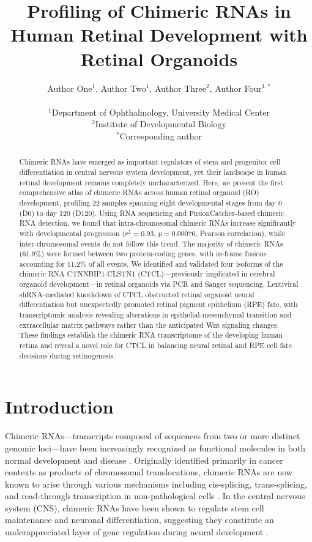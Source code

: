 \documentclass[12pt]{article}
\title{Profiling of Chimeric RNAs in Human Retinal Development with Retinal Organoids}
\author{Author One$^{1}$, Author Two$^{1}$, Author Three$^{2}$, Author Four$^{1,*}$\\
\\
\small $^{1}$Department of Ophthalmology, University Medical Center\\
\small $^{2}$Institute of Developmental Biology\\
\small $^{*}$Corresponding author}
\date{}
\begin{document}
\maketitle

\begin{abstract}
Chimeric RNAs have emerged as important regulators of stem and progenitor cell differentiation in central nervous system development, yet their landscape in human retinal development remains completely uncharacterized. Here, we present the first comprehensive atlas of chimeric RNAs across human retinal organoid (RO) development, profiling 22 samples spanning eight developmental stages from day 0 (D0) to day 120 (D120). Using RNA sequencing and FusionCatcher-based chimeric RNA detection, we found that intra-chromosomal chimeric RNAs increase significantly with developmental progression ($r^2 = 0.93$, $p = 0.00076$, Pearson correlation), while inter-chromosomal events do not follow this trend. The majority of chimeric RNAs (61.9\%) were formed between two protein-coding genes, with in-frame fusions accounting for 11.2\% of all events. We identified and validated four isoforms of the chimeric RNA CTNNBIP1-CLSTN1 (CTCL)---previously implicated in cerebral organoid development---in retinal organoids via PCR and Sanger sequencing. Lentiviral shRNA-mediated knockdown of CTCL obstructed retinal organoid neural differentiation but unexpectedly promoted retinal pigment epithelium (RPE) fate, with transcriptomic analysis revealing alterations in epithelial-mesenchymal transition and extracellular matrix pathways rather than the anticipated Wnt signaling changes. These findings establish the chimeric RNA transcriptome of the developing human retina and reveal a novel role for CTCL in balancing neural retinal and RPE cell fate decisions during retinogenesis.
\end{abstract}

\section{Introduction}

Chimeric RNAs---transcripts composed of sequences from two or more distinct genomic loci---have been increasingly recognized as functional molecules in both normal development and disease \citep{li2009chimeric,wu2019chimeric}. Originally identified primarily in cancer contexts as products of chromosomal translocations, chimeric RNAs are now known to arise through various mechanisms including cis-splicing, trans-splicing, and read-through transcription in non-pathological cells \citep{kannan2011recurrent,jividen2014chimeric}. In the central nervous system (CNS), chimeric RNAs have been shown to regulate stem cell maintenance and neuronal differentiation, suggesting they constitute an underappreciated layer of gene regulation during neural development \citep{wu2019chimeric,chase2020role}.
\end{document}
